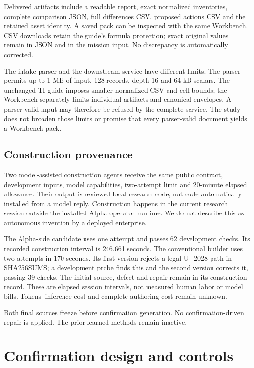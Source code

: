 \documentclass[11pt,a4paper]{article}
\begin{document}
Delivered artifacts include a readable report, exact normalized inventories,
complete comparison JSON, full differences CSV, proposed actions CSV and the
retained asset identity. A saved pack can be inspected with the same Workbench.
CSV downloads retain the guide's formula protection; exact original values remain
in JSON and in the mission input. No discrepancy is automatically corrected.

The intake parser and the downstream service have different limits. The parser
permits up to 1 MB of input, 128 records, depth 16 and 64 kB scalars. The unchanged
TI guide imposes smaller normalized-CSV and cell bounds; the Workbench separately
limits individual artifacts and canonical envelopes. A parser-valid input may
therefore be refused by the complete service. The study does not broaden those
limits or promise that every parser-valid document yields a Workbench pack.

\subsection{Construction provenance}
Two model-assisted construction agents receive the same public contract,
development inputs, model capabilities, two-attempt limit and 20-minute elapsed
allowance. Their output is reviewed local research code, not code automatically
installed from a model reply. Construction happens in the current research
session outside the installed Alpha operator runtime. We do not describe this
as autonomous invention by a deployed enterprise.

The Alpha-side candidate uses one attempt and passes 62 development checks.
Its recorded construction interval is 246.661 seconds. The conventional builder
uses two attempts in 170 seconds. Its first version rejects a legal U+2028 path
in SHA256SUMS; a development probe finds this and the second version corrects it,
passing 39 checks. The initial source, defect and repair remain in its construction
record. These are elapsed session intervals, not measured human labor or model
bills. Tokens, inference cost and complete authoring cost remain unknown.

Both final sources freeze before confirmation generation. No confirmation-driven
repair is applied. The prior learned methods remain inactive.

\section{Confirmation design and controls}
\end{document}
